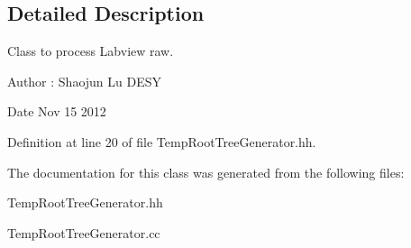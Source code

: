 \subsection{Detailed Description}
Class to process Labview raw. 

\begin{DoxyAuthor}{Author}
\-: Shaojun Lu D\-E\-S\-Y 
\end{DoxyAuthor}
\begin{DoxyDate}{Date}
Nov 15 2012 
\end{DoxyDate}


Definition at line 20 of file Temp\-Root\-Tree\-Generator.\-hh.



The documentation for this class was generated from the following files\-:\begin{DoxyCompactItemize}
\item 
Temp\-Root\-Tree\-Generator.\-hh\item 
Temp\-Root\-Tree\-Generator.\-cc\end{DoxyCompactItemize}
